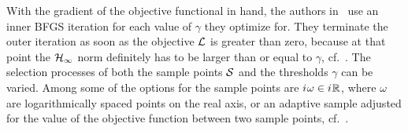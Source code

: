 With the gradient of the objective functional in hand, the authors in~\cite{Schwerdtner2023} use an inner BFGS iteration for each value of $\gamma$ they optimize for.
They terminate the outer iteration as soon as the objective $\mathcal{L}$ is greater than zero, because at that point the $\mathcal{H}_\infty$ norm definitely has to be larger than or equal to $\gamma$, cf.~\cite[Section~3.2.2]{Schwerdtner2023}.
The selection processes of both the sample points $\mathcal{S}$ and the thresholds $\gamma$ can be varied.
Among some of the options for the sample points are ${i\mkern1mu} \omega \in {i\mkern1mu} \mathbb{R}$, where $\omega$ are logarithmically spaced points on the real axis, or an adaptive sample adjusted for the value of the objective function between two sample points, cf.~\cite{SV2021}.

